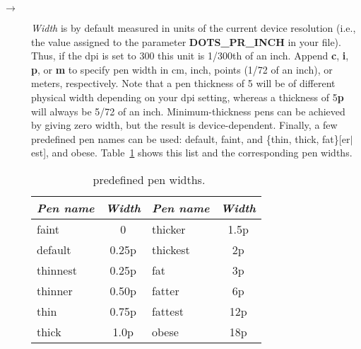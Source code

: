\begin{description}
%
\item[$\rightarrow$]\emph{Width} is by default measured in units of the
current device resolution (i.e., the value assigned to the parameter
\textbf{DOTS\_PR\_INCH} in your  file).  Thus, if the
dpi is set to 300 this unit is 1/300th of an inch.  Append \textbf{c},
\textbf{i}, \textbf{p}, or \textbf{m} to specify pen width in cm, inch, points
(1/72 of an inch), or meters, respectively.
Note that a pen thickness of 5 will be of different physical width
depending on your dpi setting, whereas a thickness of 5\textbf{p} will
always be 5/72 of an inch.  Minimum-thickness pens can be achieved by
giving zero width, but the result is device-dependent.  Finally, a few
predefined pen names can be used: default, faint, and \{thin, thick, fat\}[er$|$est],
and obese.  Table~\ref{tbl:pennames} shows this list and the corresponding pen widths.
\begin{table}[h]
\centering
\begin{tabular}{|l|c||l|c|} \hline
\multicolumn{1}{|c|}{\emph{Pen name}}	&	\multicolumn{1}{c|}{\emph{Width}}	&	\multicolumn{1}{|c|}{\emph{Pen name}}	&	\multicolumn{1}{c|}{\emph{Width}} \\ \hline
faint		&	0	&	thicker		&	1.5p \\ \hline 
default		&	0.25p	&	thickest	&	2p \\ \hline
thinnest	&	0.25p	&	fat		&	3p \\ \hline
thinner		&	0.50p	&	fatter		&	6p \\ \hline 
thin		&	0.75p	&	fattest		&	12p \\ \hline  
thick		&	1.0p	&	obese		&	18p \\	\hline 
\end{tabular}
\caption{\gmt\ predefined pen widths.}
\label{tbl:pennames}
\end{table}


\end{description}
